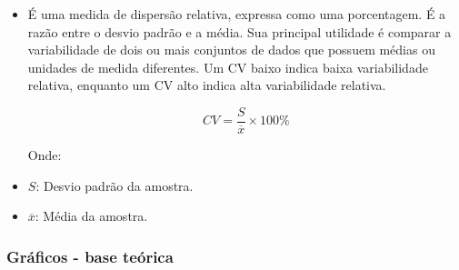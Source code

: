 \documentclass[a4paper,11pt]{article}
\begin{document}
\begin{itemize}
    \item É uma medida de dispersão relativa, expressa como uma porcentagem. É a razão entre o desvio padrão e a média. Sua principal utilidade é comparar a variabilidade de dois ou mais conjuntos de dados que possuem médias ou unidades de medida diferentes. Um CV baixo indica baixa variabilidade relativa, enquanto um CV alto indica alta variabilidade relativa.

    \[ CV = \frac{S}{\overline{x}} \times 100\% \]

    Onde:
    \item $S$: Desvio padrão da amostra.
    \item $\overline{x}$: Média da amostra.


\end{itemize}

\subsubsection*{Gráficos - base teórica} 
\end{document}
